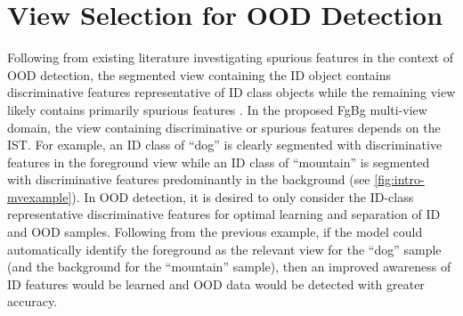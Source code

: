 \section{View Selection for OOD Detection}
\label{sec:propwork-mod}


Following from existing literature investigating spurious features in the context of OOD detection, the segmented view containing the ID object contains discriminative features representative of ID class objects while the remaining view likely contains primarily spurious features \cite{miyai2024locoop,neuhaus2023spurious}. In the proposed FgBg multi-view domain, the view containing discriminative or spurious features depends on the IST. For example, an ID class of ``dog'' is clearly segmented with discriminative features in the foreground view while an ID class of ``mountain'' is segmented with discriminative features predominantly in the background (see \ref{fig:intro-mvexample}). In OOD detection, it is desired to only consider the ID-class representative discriminative features for optimal learning and separation of ID and OOD samples. Following from the previous example, if the model could automatically identify the foreground as the relevant view for the ``dog'' sample (and the background for the ``mountain'' sample), then an improved awareness of ID features would be learned and OOD data would be detected with greater accuracy.

